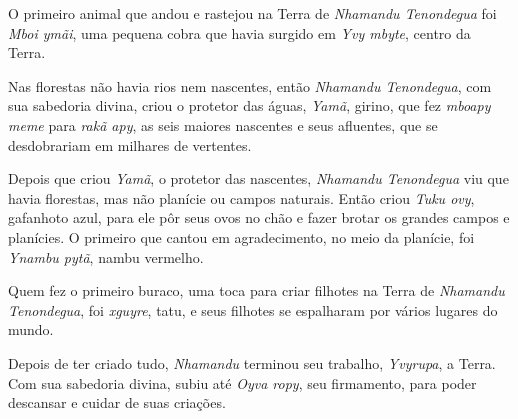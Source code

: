 
O primeiro animal que andou e rastejou na Terra de \emph{Nhamandu
Tenondegua} foi \emph{Mboi ymãi}, uma pequena cobra que havia surgido em
\emph{Yvy mbyte}, centro da Terra.


Nas florestas não havia rios nem nascentes, então \emph{Nhamandu
Tenondegua}, com sua sabedoria divina, criou o protetor das águas,
\emph{Yamã}, girino, que fez \emph{mboapy meme} para \emph{rakã apy}, as
seis maiores nascentes e seus afluentes, que se desdobrariam em milhares
de vertentes.



Depois que criou \emph{Yamã}, o protetor das nascentes, \emph{Nhamandu
Tenondegua} viu que havia florestas, mas não planície ou campos
naturais. Então criou \emph{Tuku ovy}, gafanhoto azul, para ele pôr
seus ovos no chão e fazer brotar os grandes campos e planícies. O primeiro que cantou em agradecimento, no meio da planície, foi
\emph{Ynambu pytã}, nambu vermelho.



 

Quem fez o primeiro buraco, uma toca para criar filhotes na Terra de
\emph{Nhamandu Tenondegua}, foi \emph{xguyre}, tatu, e seus filhotes se
espalharam por vários lugares do mundo.

Depois de ter criado tudo, \emph{Nhamandu} terminou seu trabalho,
\emph{Yvyrupa}, a Terra. Com sua sabedoria divina, subiu até \emph{Oyva
ropy}, seu firmamento, para poder descansar e cuidar de suas
criações.
